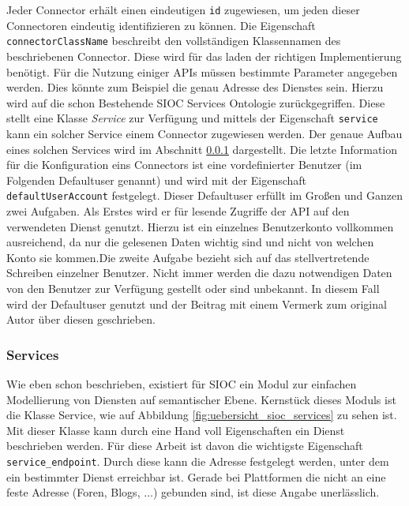 Jeder Connector erhält einen eindeutigen \texttt{id} zugewiesen, um jeden dieser Connectoren eindeutig identifizieren zu können. Die Eigenschaft \texttt{connectorClassName} beschreibt den vollständigen Klassennamen des beschriebenen Connector. Diese wird für das laden der richtigen Implementierung benötigt. Für die Nutzung einiger APIs müssen bestimmte Parameter angegeben werden. Dies könnte zum Beispiel die genau Adresse des Dienstes sein. Hierzu wird auf die schon Bestehende SIOC Services Ontologie zurückgegriffen. Diese stellt eine Klasse \emph{Service} zur Verfügung und mittels der Eigenschaft \texttt{service} kann ein solcher Service einem Connector zugewiesen werden. Der genaue Aufbau eines solchen Services wird im Abschnitt \ref{ssub:services} dargestellt. Die letzte Information für die Konfiguration eins Connectors ist eine vordefinierter Benutzer (im Folgenden Defaultuser genannt) und wird mit der Eigenschaft \texttt{defaultUserAccount} festgelegt. Dieser Defaultuser erfüllt im Großen und Ganzen zwei Aufgaben. Als Erstes wird er für lesende Zugriffe der API auf den verwendeten Dienst genutzt. Hierzu ist ein einzelnes Benutzerkonto vollkommen ausreichend, da nur die gelesenen Daten wichtig sind und nicht von welchen Konto sie kommen.Die zweite Aufgabe bezieht sich auf das stellvertretende Schreiben einzelner Benutzer. Nicht immer werden die dazu notwendigen Daten von den Benutzer zur Verfügung gestellt oder sind unbekannt. In diesem Fall wird der Defaultuser genutzt und der Beitrag mit einem Vermerk zum original Autor über diesen geschrieben.


\subsubsection{Services} %
\label{ssub:services}

Wie eben schon beschrieben, existiert für SIOC ein Modul zur einfachen Modellierung von Diensten auf semantischer Ebene. Kernstück dieses Moduls ist die Klasse Service, wie auf Abbildung \ref{fig:uebersicht_sioc_services} zu sehen ist. Mit dieser Klasse kann durch eine Hand voll Eigenschaften ein Dienst beschrieben werden. Für diese Arbeit ist davon die wichtigste Eigenschaft \texttt{service\_endpoint}. Durch diese kann die Adresse festgelegt werden, unter dem ein bestimmter Dienst erreichbar ist. Gerade bei Plattformen die nicht an eine feste Adresse (Foren, Blogs, $\dots$) gebunden sind, ist diese Angabe unerlässlich. 

